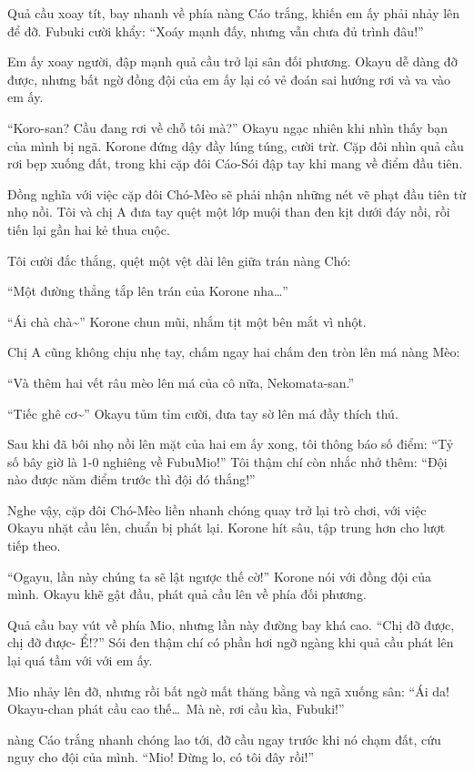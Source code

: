 \documentclass[../main.tex]{subfiles}
\begin{document}
Quả cầu xoay tít, bay nhanh về phía nàng Cáo trắng, khiến em ấy phải nhảy lên để đỡ. Fubuki cười khẩy: ``Xoáy mạnh đấy, nhưng vẫn chưa đủ trình đâu!''

Em ấy xoay người, đập mạnh quả cầu trở lại sân đối phương. Okayu dễ dàng đỡ được, nhưng bất ngờ đồng đội của em ấy lại có vẻ đoán sai hướng rơi và va vào em ấy.

``Koro-san? Cầu đang rơi về chỗ tôi mà?'' Okayu ngạc nhiên khi nhìn thấy bạn của mình bị ngã. Korone đứng dậy đầy lúng túng, cười trừ. Cặp đôi nhìn quả cầu rơi bẹp xuống đất, trong khi cặp đôi Cáo-Sói đập tay khi mang về điểm đầu tiên.

Đồng nghĩa với việc cặp đôi Chó-Mèo sẽ phải nhận những nét vẽ phạt đầu tiên từ nhọ nồi. Tôi và chị A đưa tay quệt một lớp muội than đen kịt dưới đáy nồi, rồi tiến lại gần hai kẻ thua cuộc.

Tôi cười đắc thắng, quệt một vệt dài lên giữa trán nàng Chó:

``Một đường thẳng tắp lên trán của Korone nha\dots''

``Ái chà chà\~{}'' Korone chun mũi, nhắm tịt một bên mắt vì nhột.

Chị A cũng không chịu nhẹ tay, chấm ngay hai chấm đen tròn lên má nàng Mèo:

``Và thêm hai vết râu mèo lên má của cô nữa, Nekomata-san.''

``Tiếc ghê cơ\~{}'' Okayu tủm tỉm cười, đưa tay sờ lên má đầy thích thú.

Sau khi đã bôi nhọ nồi lên mặt của hai em ấy xong, tôi thông báo số điểm: ``Tỷ số bây giờ là 1-0 nghiêng về FubuMio!'' Tôi thậm chí còn nhắc nhở thêm: ``Đội nào được năm điểm trước thì đội đó thắng!''

Nghe vậy, cặp đôi Chó-Mèo liền nhanh chóng quay trở lại trò chơi, với việc Okayu nhặt cầu lên, chuẩn bị phát lại. Korone hít sâu, tập trung hơn cho lượt tiếp theo.

``Ogayu, lần này chúng ta sẽ lật ngược thế cờ!'' Korone nói với đồng đội của mình. Okayu khẽ gật đầu, phát quả cầu lên về phía đối phương.

Quả cầu bay vút về phía Mio, nhưng lần này đường bay khá cao. ``Chị đỡ được, chị đỡ được- Ể!?'' Sói đen thậm chí có phần hơi ngỡ ngàng khi quả cầu phát lên lại quá tầm với với em ấy.

Mio nhảy lên đỡ, nhưng rồi bất ngờ mất thăng bằng và ngã xuống sân: ``Ái da! Okayu-chan phát cầu cao thế\dots\ Mà nè, rơi cầu kìa, Fubuki!''

nàng Cáo trắng nhanh chóng lao tới, đỡ cầu ngay trước khi nó chạm đất, cứu nguy cho đội của mình. ``Mio! Đừng lo, có tôi đây rồi!''
\end{document}
